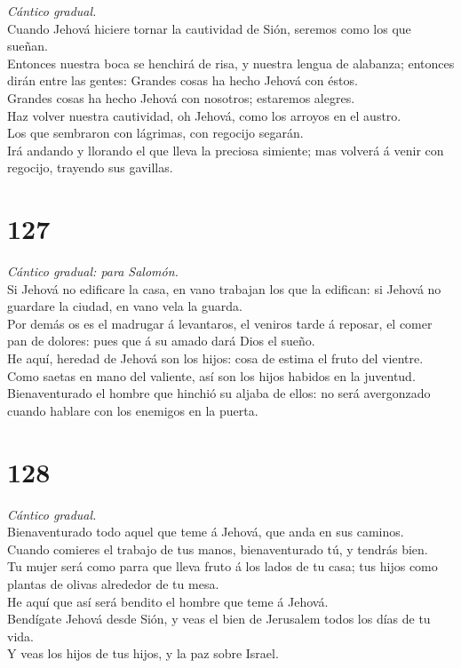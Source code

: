  \emph{Cántico gradual.}\\
Cuando Jehová hiciere tornar la cautividad de Sión, seremos como los que
sueñan.\\
 Entonces nuestra boca se henchirá de risa, y nuestra lengua
de alabanza; entonces dirán entre las gentes: Grandes cosas ha hecho
Jehová con éstos.\\
 Grandes cosas ha hecho Jehová con nosotros; estaremos
alegres.\\
 Haz volver nuestra cautividad, oh Jehová, como los arroyos
en el austro.\\
 Los que sembraron con lágrimas, con regocijo segarán.\\
 Irá andando y llorando el que lleva la preciosa simiente;
mas volverá á venir con regocijo, trayendo sus gavillas.

\hypertarget{section-126}{%
\section{127}\label{section-126}}

 \emph{Cántico gradual: para Salomón.}\\
Si Jehová no edificare la casa, en vano trabajan los que la edifican: si
Jehová no guardare la ciudad, en vano vela la guarda.\\
 Por demás os es el madrugar á levantaros, el veniros tarde
á reposar, el comer pan de dolores: pues que á su amado dará Dios el
sueño.\\
 He aquí, heredad de Jehová son los hijos: cosa de estima el
fruto del vientre.\\
 Como saetas en mano del valiente, así son los hijos habidos
en la juventud.\\
 Bienaventurado el hombre que hinchió su aljaba de ellos: no
será avergonzado cuando hablare con los enemigos en la puerta.

\hypertarget{section-127}{%
\section{128}\label{section-127}}

 \emph{Cántico gradual.}\\
Bienaventurado todo aquel que teme á Jehová, que anda en sus caminos.\\
 Cuando comieres el trabajo de tus manos, bienaventurado tú,
y tendrás bien.\\
 Tu mujer será como parra que lleva fruto á los lados de tu
casa; tus hijos como plantas de olivas alrededor de tu mesa.\\
 He aquí que así será bendito el hombre que teme á Jehová.\\
 Bendígate Jehová desde Sión, y veas el bien de Jerusalem
todos los días de tu vida.\\
 Y veas los hijos de tus hijos, y la paz sobre Israel.


